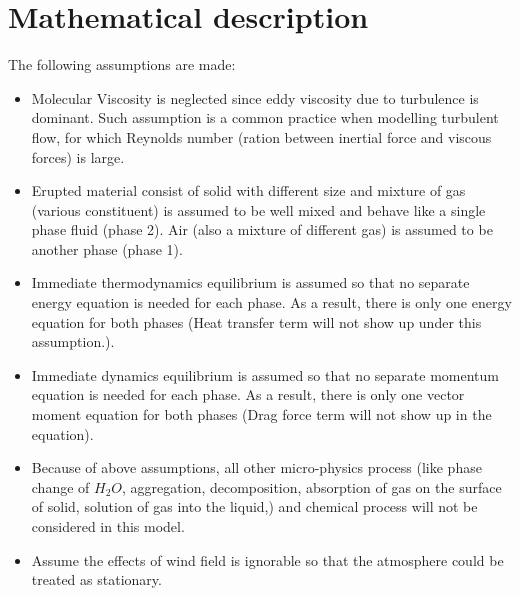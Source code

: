 \section{Mathematical description}\label{sec:chp2-Mathematical-Description}

The following assumptions are made:
\begin{itemize}
\item Molecular Viscosity is neglected since eddy viscosity due to turbulence is dominant. Such assumption is a common practice when modelling turbulent flow, for which Reynolds number (ration between inertial force and viscous forces) is large.
\item Erupted material consist of solid with different size and mixture of gas (various constituent) is assumed to be well mixed and behave like a single phase fluid (phase 2). Air (also a mixture of different gas) is assumed to be another phase (phase 1).
\item Immediate thermodynamics equilibrium is assumed so that no separate energy equation is needed for each phase. As a result, there is only one energy equation for both phases (Heat transfer term will not show up under this assumption.). 
\item Immediate dynamics equilibrium is assumed so that no separate momentum equation is needed for each phase. As a result, there is only one vector moment equation for both phases (Drag force term will not show up in the equation).
\item Because of above assumptions, all other micro-physics process (like phase change of $H_2O$, aggregation, decomposition, absorption of gas on the surface of solid, solution of gas into the liquid,) and chemical process will not be considered in this model.
\item Assume the effects of wind field is ignorable so that the atmosphere could be treated as stationary. 
\end{itemize}

